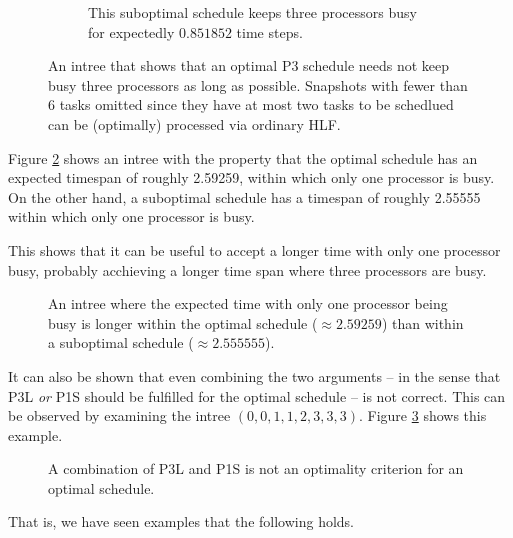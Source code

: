 \begin{figure}[ht]
\begin{subfigure}{.45\linewidth}
    \caption{This suboptimal schedule keeps three processors busy for expectedly $0.851852$ time steps.}
  \end{subfigure}
  \caption{An intree that shows that an optimal P3 schedule needs not keep busy three processors as long as possible. Snapshots with fewer than 6 tasks omitted since they have at most two tasks to be schedlued can be (optimally) processed via ordinary HLF. }
  \label{fig:p3-p3l-suboptimal-example}
\end{figure}

Figure \ref{fig:p3-p1s-suboptimal-example} shows an intree with the property that the optimal schedule has an expected timespan of roughly 2.59259, within which only one processor is busy. On the other hand, a suboptimal schedule has a timespan of roughly 2.55555 within which only one processor is busy.

This shows that it can be useful to accept a longer time with only one processor busy, probably acchieving a longer time span where three processors are busy.

\begin{figure}[ht]
  \centering
  
  \caption{An intree where the expected time with only one processor being busy is longer within the optimal schedule ($\approx 2.59259$) than within a suboptimal schedule ($\approx 2.555555$). }
  \label{fig:p3-p1s-suboptimal-example}
\end{figure}

It can also be shown that even combining the two arguments -- in the sense that P3L \emph{or} P1S should be fulfilled for the optimal schedule -- is not correct. This can be observed by examining the intree $(0, 0, 1, 1, 2, 3, 3, 3)$. Figure \ref{fig:p3l-p1s-combo-suboptimal} shows this example.

\begin{figure}[ht]
  \centering
  
  \caption{A combination of P3L and P1S is not an optimality criterion for an optimal schedule.}
  \label{fig:p3l-p1s-combo-suboptimal}
\end{figure}

That is, we have seen examples that the following holds.

